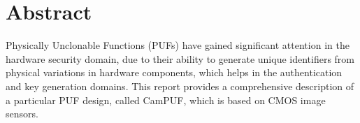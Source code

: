 \chapter*{Abstract}

Physically Unclonable Functions (PUFs) have gained significant attention in the hardware security domain, due to their ability to generate unique identifiers
from physical variations in hardware components, which helps in the authentication and key generation domains. This report provides a comprehensive description
of a particular PUF design, called CamPUF, which is based on CMOS image sensors.

